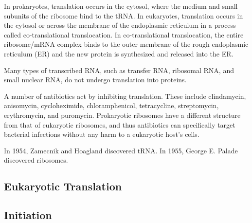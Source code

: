 In prokaryotes, translation occurs in the cytosol, where the medium and small subunits of the ribosome bind to the tRNA. In eukaryotes, translation occurs in the cytosol or across the membrane of the endoplasmic reticulum in a process called co-translational translocation. In co-translational translocation, the entire ribosome/mRNA complex binds to the outer membrane of the rough endoplasmic reticulum (ER) and the new protein is synthesized and released into the ER.

Many types of transcribed RNA, such as transfer RNA, ribosomal RNA, and small nuclear RNA, do not undergo translation into proteins.

A number of antibiotics act by inhibiting translation. These include clindamycin, anisomycin, cycloheximide, chloramphenicol, tetracycline, streptomycin, erythromycin, and puromycin. Prokaryotic ribosomes have a different structure from that of eukaryotic ribosomes, and thus antibiotics can specifically target bacterial infections without any harm to a eukaryotic host's cells.

In 1954, Zamecnik and Hoagland discovered tRNA. In 1955, George E. Palade discovered ribosomes.

\hypertarget{eukaryotic-translation}{%
\subsection{Eukaryotic Translation}\label{eukaryotic-translation}}

\hypertarget{initiation-2}{%
\subsection{Initiation}\label{initiation-2}}

